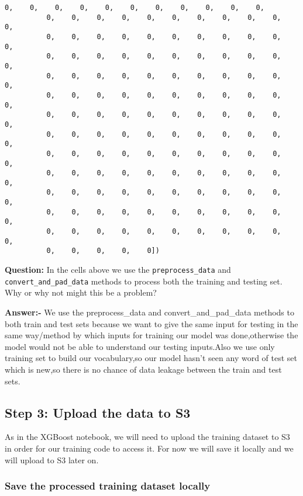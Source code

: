 \documentclass[11pt]{article}
\begin{document}
\begin{tcolorbox}[breakable, size=fbox, boxrule=.5pt, pad at break*=1mm, opacityfill=0]
\begin{Verbatim}[commandchars=\\\{\}]
          0,    0,    0,    0,    0,    0,    0,    0,    0,    0,    0,
          0,    0,    0,    0,    0,    0,    0,    0,    0,    0,    0,
          0,    0,    0,    0,    0,    0,    0,    0,    0,    0,    0,
          0,    0,    0,    0,    0,    0,    0,    0,    0,    0,    0,
          0,    0,    0,    0,    0,    0,    0,    0,    0,    0,    0,
          0,    0,    0,    0,    0,    0,    0,    0,    0,    0,    0,
          0,    0,    0,    0,    0,    0,    0,    0,    0,    0,    0,
          0,    0,    0,    0,    0,    0,    0,    0,    0,    0,    0,
          0,    0,    0,    0,    0,    0,    0,    0,    0,    0,    0,
          0,    0,    0,    0,    0,    0,    0,    0,    0,    0,    0,
          0,    0,    0,    0,    0,    0,    0,    0,    0,    0,    0,
          0,    0,    0,    0,    0,    0,    0,    0,    0,    0,    0,
          0,    0,    0,    0,    0,    0,    0,    0,    0,    0,    0,
          0,    0,    0,    0,    0])
\end{Verbatim}
\end{tcolorbox}
        
    \textbf{Question:} In the cells above we use the
\texttt{preprocess\_data} and \texttt{convert\_and\_pad\_data} methods
to process both the training and testing set. Why or why not might this
be a problem?

    \textbf{Answer:-} We use the preprocess\_data and
convert\_and\_pad\_data methods to both train and test sets because we
want to give the same input for testing in the same way/method by which
inputs for training our model was done,otherwise the model would not be
able to understand our testing inputs.Also we use only training set to
build our vocabulary,so our model hasn't seen any word of test set which
is new,so there is no chance of data leakage between the train and test
sets.

    \hypertarget{step-3-upload-the-data-to-s3}{%
\subsection{Step 3: Upload the data to
S3}\label{step-3-upload-the-data-to-s3}}

As in the XGBoost notebook, we will need to upload the training dataset
to S3 in order for our training code to access it. For now we will save
it locally and we will upload to S3 later on.

\hypertarget{save-the-processed-training-dataset-locally}{%
\subsubsection{Save the processed training dataset
locally}\label{save-the-processed-training-dataset-locally}}
\end{document}
